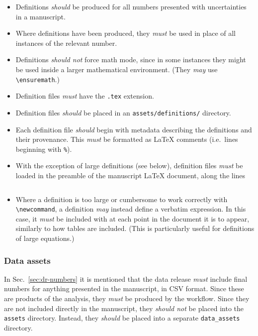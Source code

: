 \documentclass{article}
\newcommand\rfcword[1]{\emph{#1}\xspace}
\newcommand\must{\rfcword{must}}
\newcommand\should{\rfcword{should}}
\newcommand\shouldnot{\rfcword{should not}}
\newcommand\may{\rfcword{may}}
\newcommand\filename[1]{\texttt{#1}\xspace}
\begin{document}
\begin{itemize}
  \item
        Definitions \should be produced for all numbers presented with uncertainties in a manuscript.
  \item
        Where definitions have been produced,
        they \must be used in place of all instances of the relevant number.
  \item
        Definitions \shouldnot force math mode,
        since in some instances
        they might be used inside a larger mathematical environment.
        (They \may use \verb|\ensuremath|.)
  \item
        Definition files \must have the \filename{.tex} extension.
  \item
        Definition files \should be placed in an \filename{assets/definitions/} directory.
  \item
        Each definition file \should begin with metadata describing the definitions and their provenance.
        This \must be formatted as LaTeX comments
        (i.e.\ lines beginning with \verb|%|).
  \item
        With the exception of large definitions (see below),
        definition files \must be loaded in the preamble of the manuscript LaTeX document,
        along the lines
\begin{verbatim}

\end{verbatim}
  \item
        Where a definition is too large or cumbersome to work correctly with \verb|\newcommand|,
        a definition \may instead define a verbatim expression.
        In this case,
        it \must be included with \verb|| at each point in the document it is to appear,
        similarly to how tables are included.
        (This is particularly useful for definitions of large equations.)
\end{itemize}

\subsubsection{Data assets}

In Sec.~\ref{sec:dr-numbers} it is mentioned that
the data release \must include final numbers for anything presented in the manuscript,
in CSV format.
Since these are products of the analysis,
they \must be produced by the workflow.
Since they are not included directly in the manuscript,
they \shouldnot be placed into the \filename{assets} directory.
Instead,
they \should be placed into a separate \filename{data\_assets} directory.
\end{document}
